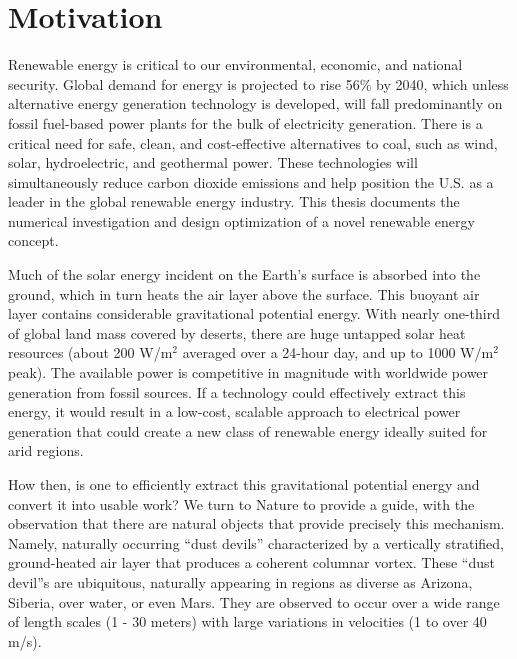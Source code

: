 \label{sec:intro}

%
%


\section{Motivation}

Renewable energy is critical to our environmental, economic, and
national security. Global demand for energy is projected to rise 56\% by
2040\cite{energy-outlook}, which unless alternative energy generation 
technology is developed, will fall predominantly on 
fossil fuel-based power plants for the bulk of electricity generation. 
There is a critical need for safe, clean, and  
cost-effective alternatives to coal, such as wind, solar, hydroelectric,
and geothermal power. These technologies will simultaneously reduce
carbon dioxide emissions and help position the U.S. as a leader in the
global renewable energy industry.
%
This thesis documents the numerical 
investigation and design optimization of a novel renewable energy concept. 

Much of the solar energy incident on the Earth's surface is absorbed
into the ground, which in turn heats the air layer above the surface.
This buoyant air layer contains considerable gravitational potential
energy. 
With nearly one-third of global land mass covered by deserts, there are huge
untapped solar heat resources (about 200 W/$\text{m}^2$
averaged over a 24-hour day, and up to 1000 W/$\text{m}^2$
peak)\cite{Hoyt197827}. The available power is competitive in magnitude
with worldwide power generation from fossil sources. If a technology
could effectively extract this energy, it would result in a low-cost,
scalable approach to electrical power generation that could create a new
class of renewable energy ideally suited for arid regions.  

How then, is one to efficiently extract this gravitational potential
energy and convert it into usable work? We turn to Nature to provide a 
guide, with the observation that there are natural objects that provide
precisely this mechanism. Namely, naturally occurring ``dust devils'' 
characterized by a vertically stratified, ground-heated air layer
that produces a coherent columnar vortex. These ``dust devil''s are
ubiquitous, naturally appearing in regions as diverse as Arizona,
Siberia, over water, or even
Mars\cite{Sinclair1969,ROG:ROG1635,JGRE:JGRE1660}.  
They are observed to occur over a wide range of length scales (1 - 30
meters) with large variations in velocities (1 to over 40
m/s)\cite{Sinclair1969}. 

